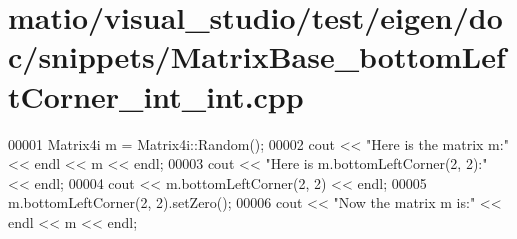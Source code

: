 \hypertarget{matio_2visual__studio_2test_2eigen_2doc_2snippets_2_matrix_base__bottom_left_corner__int__int_8cpp_source}{}\section{matio/visual\+\_\+studio/test/eigen/doc/snippets/\+Matrix\+Base\+\_\+bottom\+Left\+Corner\+\_\+int\+\_\+int.cpp}
\label{matio_2visual__studio_2test_2eigen_2doc_2snippets_2_matrix_base__bottom_left_corner__int__int_8cpp_source}

\begin{DoxyCode}
00001 Matrix4i m = Matrix4i::Random();
00002 cout << \textcolor{stringliteral}{"Here is the matrix m:"} << endl << m << endl;
00003 cout << \textcolor{stringliteral}{"Here is m.bottomLeftCorner(2, 2):"} << endl;
00004 cout << m.bottomLeftCorner(2, 2) << endl;
00005 m.bottomLeftCorner(2, 2).setZero();
00006 cout << \textcolor{stringliteral}{"Now the matrix m is:"} << endl << m << endl;
\end{DoxyCode}
